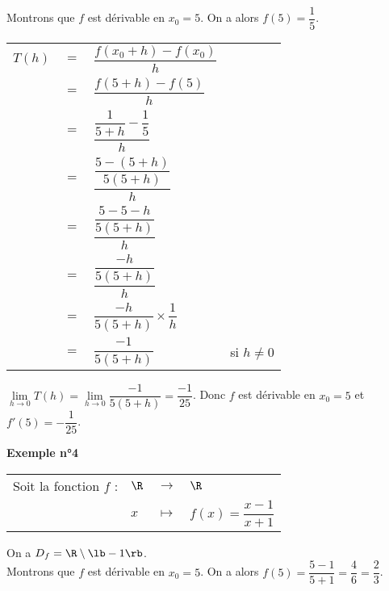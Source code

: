 Montrons que $f$ est dérivable en $x_0 = 5$. On a alors $f(5) = \dfrac{1}{5}$. \\

\begin{tabular}{llll}
$T(h)$ & $=$ & $\dfrac{f(x_0 + h) - f(x_0)}{h}$ & \vspace*{.3cm} \\
& $=$ & $\dfrac{f(5 + h) - f(5)}{h}$ & \vspace*{.3cm} \\
& $=$ & $\dfrac{ \dfrac{1}{5+h} - \dfrac{1}{5}}{h}$ & \vspace*{.3cm} \\
& $=$ & $\dfrac{\dfrac{5-(5+h)}{5(5+h)}}{h}$ & \vspace*{.3cm} \\
& $=$ & $\dfrac{\dfrac{5-5-h}{5(5+h)}}{h}$ & \vspace*{.3cm} \\
& $=$ & $\dfrac{\dfrac{-h}{5(5+h)}}{h}$ & \vspace*{.3cm} \\
& $=$ & $\dfrac{-h}{5(5+h)} \times \dfrac{1}{h}$ & \vspace*{.3cm} \\
& $=$ & $\dfrac{-1}{5\left(5+h\right)}$ & si $h \neq 0$ \\
\end{tabular}

\vspace*{.3cm}

$\lim\limits_{h \to 0} T(h) = \lim\limits_{h \to 0} \dfrac{-1}{5\left(5+h\right)} = \dfrac{-1}{25}$. Donc $f$ est dérivable en $x_0 = 5$ et $f'(5) = -\dfrac{1}{25}$. \\

\newpage

\textbf{Exemple n°4} \\

\begin{tabular}{llll}
Soit la fonction $f$ : & $\R$ & $\longrightarrow$ & $\R$ \\
& $x$ & $\longmapsto$ & $f\left(x\right) = \dfrac{x-1}{x+1}$ \\
\end{tabular}

On a $D_f = \R \setminus \lb -1 \rb$. \\

Montrons que $f$ est dérivable en $x_0 = 5$. On a alors $f(5) = \dfrac{5-1}{5+1} = \dfrac{4}{6} = \dfrac{2}{3}$. \\

